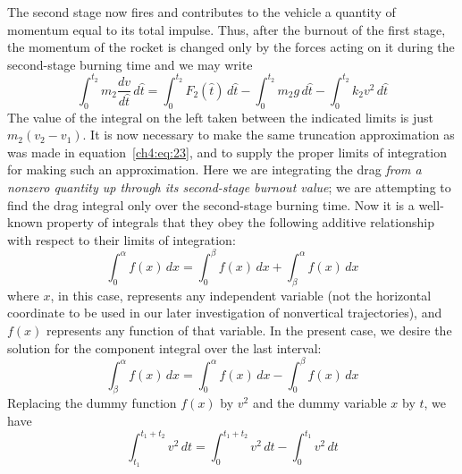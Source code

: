 The second stage now fires and contributes to the vehicle a quantity of momentum equal to its total
impulse. Thus, after the burnout of the first stage, the momentum of the rocket is changed only by
the forces acting on it during the second-stage burning time and we may write
\begin{equation}\label{ch4:eq:40}
\int_{0}^{t_2} m_2\frac{dv}{d\hat{t}}\,d\hat{t} = \int_{0}^{t_2} F_2(\hat{t})\,d\hat{t}
  - \int_{0}^{t_2} m_2g\,d\hat{t} - \int_{0}^{t_2} k_2v^{2}\,d\hat{t}
\end{equation}
The value of the integral on the left taken between the indicated limits is just $m_2(v_2 - v_1)$.
It is now necessary to make the same truncation approximation as was made in
equation~\eqref{ch4:eq:23}, and to supply the proper limits of integration for making such an
approximation. Here we are integrating the drag \emph{from a nonzero quantity up through its
second-stage burnout value}; we are attempting to find the drag integral only over the
second-stage burning time. Now it is a well-known property of integrals that they obey the
following additive relationship with respect to their limits of integration:
\begin{equation}\label{ch4:eq:41}
\int_{0}^{\alpha} f(x)\,dx = \int_{0}^{\beta} f(x)\,dx + \int_{\beta}^{\alpha} f(x)\,dx
\end{equation}
where $x$, in this case, represents any independent variable (not the horizontal coordinate to be
used in our later investigation of nonvertical trajectories), and $f(x)$ represents any function of
that variable. In the present case, we desire the solution for the component integral over the
last interval:
\begin{equation}\label{ch4:eq:42}
\int_{\beta}^{\alpha} f(x)\,dx = \int_{0}^{\alpha} f(x)\,dx - \int_{0}^{\beta} f(x)\,dx
\end{equation}
Replacing the dummy function $f(x)$ by $v^{2}$ and the dummy variable $x$ by $t$, we have
\begin{equation}\label{ch4:eq:43}
\int_{t_1}^{t_1+t_2} v^{2}\,dt = \int_{0}^{t_1+t_2} v^{2}\,dt - \int_{0}^{t_1} v^{2}\,dt
\end{equation}
